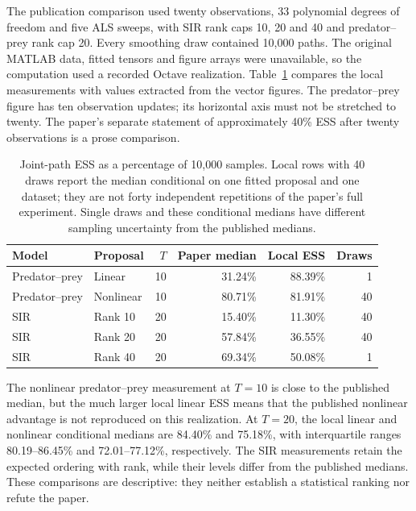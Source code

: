 The publication comparison used twenty observations, 33 polynomial degrees of
freedom and five ALS sweeps, with SIR rank caps 10, 20 and 40 and predator--prey
rank cap 20.  Every smoothing draw contained 10,000 paths.  The original MATLAB
data, fitted tensors and figure arrays were unavailable, so the computation
used a recorded Octave realization.  Table~\ref{tab:bf-hd-paper-ess-replication}
compares the local measurements with values extracted from the vector figures.
The predator--prey figure has ten observation updates; its horizontal axis
must not be stretched to twenty.  The paper's separate statement of
approximately 40\% ESS after twenty observations is a prose comparison.

\begin{table}[htbp]
\centering
\small
\begin{tabular}{llrrrr}
\toprule
Model & Proposal & $T$ & Paper median & Local ESS & Draws\\
\midrule
Predator--prey & Linear & 10 & 31.24\% & 88.39\% & 1\\
Predator--prey & Nonlinear & 10 & 80.71\% & 81.91\% & 40\\
SIR & Rank 10 & 20 & 15.40\% & 11.30\% & 40\\
SIR & Rank 20 & 20 & 57.84\% & 36.55\% & 40\\
SIR & Rank 40 & 20 & 69.34\% & 50.08\% & 1\\
\bottomrule
\end{tabular}
\caption{Joint-path ESS as a percentage of 10,000 samples.  Local rows with
40 draws report the median conditional on one fitted proposal and one dataset;
they are not forty independent repetitions of the paper's full experiment.
Single draws and these conditional medians have different sampling uncertainty
from the published medians.}
\label{tab:bf-hd-paper-ess-replication}
\end{table}

The nonlinear predator--prey measurement at $T=10$ is close to the published
median, but the much larger local linear ESS means that the published
nonlinear advantage is not reproduced on this realization.  At $T=20$,
the local linear and nonlinear conditional medians are 84.40\% and 75.18\%,
with interquartile ranges 80.19--86.45\% and 72.01--77.12\%, respectively.
The SIR measurements retain the expected ordering with rank, while their
levels differ from the published medians.  These comparisons are descriptive:
they neither establish a statistical ranking nor refute the paper.

